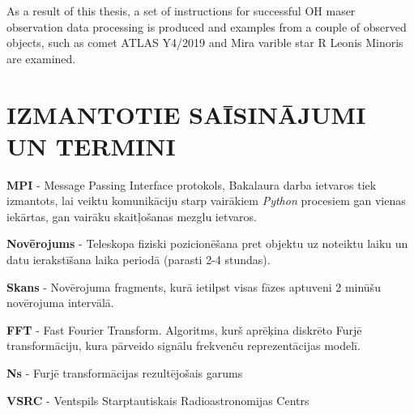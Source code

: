 \documentclass[12pt,paper=a4]{report}
\begin{document}
{%

As a result of this thesis, a set of instructions for successful OH maser observation data processing is produced and examples from a couple of observed objects, such as comet ATLAS Y4/2019 and Mira varible star R Leonis Minoris are examined.



}



\chapter*{IZMANTOTIE SAĪSINĀJUMI UN TERMINI}



\textbf{MPI} - Message Passing Interface protokols, Bakalaura darba ietvaros tiek izmantots, lai veiktu komunikāciju starp vairākiem \textit{Python} procesiem gan vienas iekārtas, gan vairāku skaitļošanas mezglu ietvaros.

\textbf{Novērojums} - Teleskopa fiziski pozicionēšana pret objektu uz noteiktu laiku un datu ierakstīšana laika periodā (parasti 2-4 stundas).

\textbf{Skans} - Novērojuma fragments, kurā ietilpst visas fāzes aptuveni 2 minūšu novērojuma intervālā. 

\textbf{FFT} - Fast Fourier Transform. Algoritms, kurš aprēķina diskrēto Furjē transformāciju, kura pārveido signālu frekvenču reprezentācijas modelī.

\textbf{Ns} - Furjē transformācijas rezultējošais garums

\textbf{VSRC} - Ventspils Starptautiskais Radioastronomijas Centrs
\end{document}
